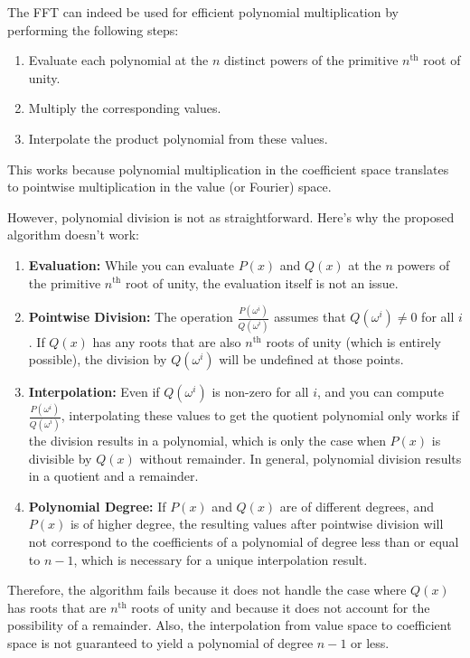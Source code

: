 \documentclass{article}
\begin{document}
The FFT can indeed be used for efficient polynomial multiplication by performing the following steps:

\begin{enumerate}
    \item Evaluate each polynomial at the \( n \) distinct powers of the primitive \( n^\text{th} \) root of unity.
    \item Multiply the corresponding values.
    \item Interpolate the product polynomial from these values.
\end{enumerate}

This works because polynomial multiplication in the coefficient space translates to pointwise multiplication in the value (or Fourier) space.

However, polynomial division is not as straightforward. Here's why the proposed algorithm doesn't work:

\begin{enumerate}
    \item \textbf{Evaluation:} While you can evaluate \( P(x) \) and \( Q(x) \) at the \( n \) powers of the primitive \( n^\text{th} \) root of unity, the evaluation itself is not an issue.
    \item \textbf{Pointwise Division:} The operation \( \frac{P(\omega^i)}{Q(\omega^i)} \) assumes that \( Q(\omega^i) \neq 0 \) for all \( i \). If \( Q(x) \) has any roots that are also \( n^\text{th} \) roots of unity (which is entirely possible), the division by \( Q(\omega^i) \) will be undefined at those points.
    \item \textbf{Interpolation:} Even if \( Q(\omega^i) \) is non-zero for all \( i \), and you can compute \( \frac{P(\omega^i)}{Q(\omega^i)} \), interpolating these values to get the quotient polynomial only works if the division results in a polynomial, which is only the case when \( P(x) \) is divisible by \( Q(x) \) without remainder. In general, polynomial division results in a quotient and a remainder.
    \item \textbf{Polynomial Degree:} If \( P(x) \) and \( Q(x) \) are of different degrees, and \( P(x) \) is of higher degree, the resulting values after pointwise division will not correspond to the coefficients of a polynomial of degree less than or equal to \( n-1 \), which is necessary for a unique interpolation result.
\end{enumerate}

Therefore, the algorithm fails because it does not handle the case where \( Q(x) \) has roots that are \( n^\text{th} \) roots of unity and because it does not account for the possibility of a remainder. Also, the interpolation from value space to coefficient space is not guaranteed to yield a polynomial of degree \( n-1 \) or less.
\end{document}
